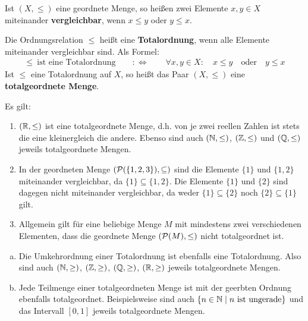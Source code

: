 \begin{defin}[Vergleichbarkeit] \label{def:totalordnung}  
    Ist $(X,\le)$ eine geordnete Menge, so heißen zwei Elemente $x,y\in X$ miteinander \textbf{vergleichbar}, wenn $x\le y$ oder $y\le x$.

    Die Ordnungsrelation $\le$ heißt eine \textbf{Totalordnung}, wenn alle Elemente miteinander vergleichbar sind. Als Formel:
    \begin{align*}
        \le\ \text{ist eine Totalordnung}\qquad:\Leftrightarrow\qquad \forall x,y \in X:\quad x\le y\quad \text{oder}\quad y\le x 
    \end{align*}
    Ist $\le$ eine Totalordnung auf $X$, so heißt das Paar $(X,\le)$ eine \textbf{totalgeordnete Menge}.
\end{defin}


\begin{bsp}
    Es gilt:
    \begin{enumerate}
        \item $(\mathbb R,\le)$ ist eine totalgeordnete Menge, d.h. von je zwei reellen Zahlen ist stets die eine kleinergleich die andere. Ebenso sind auch $(\mathbb N,\le)$, $(\mathbb Z,\le)$ und $(\mathbb Q,\le)$ jeweils totalgeordnete Mengen.
        \item In der geordneten Menge $(\mathcal P(\{1,2,3\}),\subseteq)$ sind die Elemente $\{1\}$ und $\{1,2\}$ miteinander vergleichbar, da $\{1\}\subseteq \{1,2\}$. Die Elemente $\{1\}$ und $\{2\}$ sind dagegen nicht miteinander vergleichbar, da weder $\{1\}\subseteq\{2\}$ noch $\{2\}\subseteq \{1\}$ gilt.
        \item Allgemein gilt für eine beliebige Menge $M$ mit mindestens zwei verschiedenen Elementen, dass die geordnete Menge $(\mathcal P(M),\le)$ nicht totalgeordnet ist.
    \end{enumerate}
\end{bsp}


\begin{bem} \quad
    \begin{enumerate}[a)]
        \item Die Umkehrordnung einer Totalordnung ist ebenfalls eine Totalordnung. Also sind auch $(\mathbb N,\ge)$, $(\mathbb Z,\ge)$, $(\mathbb Q,\ge)$, $(\mathbb R,\ge)$ jeweils totalgeordnete Mengen.
        \item Jede Teilmenge einer totalgeordneten Menge ist mit der geerbten Ordnung ebenfalls totalgeordnet. Beispielsweise sind auch $\{n\in \mathbb N\mid n\ \text{ist ungerade}\}$ und das Intervall $[0,1]$ jeweils totalgeordnete Mengen.
    \end{enumerate}
\end{bem}


